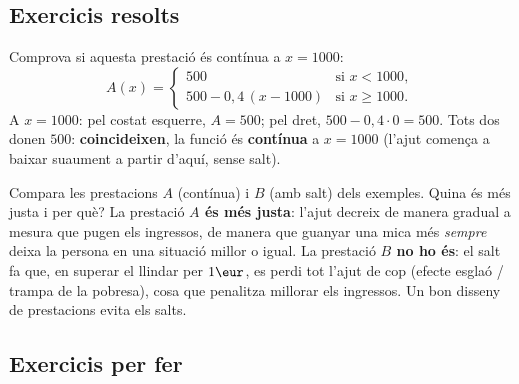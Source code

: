 \subsection{Exercicis resolts}

\begin{exresolt}
Comprova si aquesta prestació és contínua a $x=\num{1000}$:
\[
A(x)=
\begin{cases}
500 & \text{si } x<\num{1000},\\[2pt]
500-0,4\,(x-\num{1000}) & \text{si } x\ge \num{1000}.
\end{cases}
\]
\solucio
A $x=\num{1000}$: pel costat esquerre, $A=500$; pel dret,
$500-0,4\cdot 0=500$. Tots dos donen $500$: \textbf{coincideixen}, la funció és
\textbf{contínua} a $x=\num{1000}$ (l'ajut comença a baixar suaument a partir d'aquí,
sense salt).
\end{exresolt}

\begin{exresolt}
Compara les prestacions $A$ (contínua) i $B$ (amb salt) dels exemples. Quina és més
justa i per què?
\solucio
La prestació \textbf{$A$ és més justa}: l'ajut decreix de manera gradual a mesura que
pugen els ingressos, de manera que guanyar una mica més \emph{sempre} deixa la persona
en una situació millor o igual. La prestació \textbf{$B$ no ho és}: el salt fa que, en
superar el llindar per $1\eur$, es perdi tot l'ajut de cop (efecte esglaó / trampa de
la pobresa), cosa que penalitza millorar els ingressos. Un bon disseny de prestacions
evita els salts.
\end{exresolt}

\subsection{Exercicis per fer}

